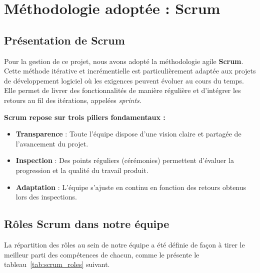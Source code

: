 \documentclass[12pt,a4paper]{report}
\begin{document}
\section{Méthodologie adoptée : Scrum}

\subsection{Présentation de Scrum}

Pour la gestion de ce projet, nous avons adopté la méthodologie agile \textbf{Scrum}. Cette méthode itérative et incrémentielle est particulièrement adaptée aux projets de développement logiciel où les exigences peuvent évoluer au cours du temps. Elle permet de livrer des fonctionnalités de manière régulière et d'intégrer les retours au fil des itérations, appelées \textit{sprints}.

\begin{infobox}
\textbf{Scrum repose sur trois piliers fondamentaux :}
\begin{itemize}
  \item \textbf{Transparence} : Toute l'équipe dispose d'une vision claire et partagée de l'avancement du projet.
  \item \textbf{Inspection} : Des points réguliers (cérémonies) permettent d'évaluer la progression et la qualité du travail produit.
  \item \textbf{Adaptation} : L'équipe s'ajuste en continu en fonction des retours obtenus lors des inspections.
\end{itemize}
\end{infobox}

\subsection{Rôles Scrum dans notre équipe}

La répartition des rôles au sein de notre équipe a été définie de façon à tirer le meilleur parti des compétences de chacun, comme le présente le tableau~\ref{tab:scrum_roles} suivant.
\end{document}
